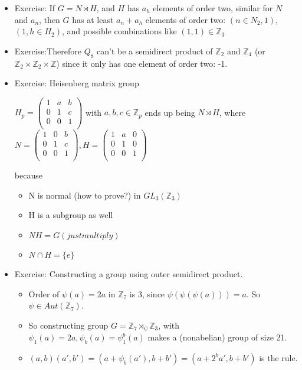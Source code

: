 \documentclass[11pt, oneside]{article}   	%
\begin{document}
\begin{itemize}
\item Exercise: If $G  = N \rtimes H$, and $H$ has $a_h$ elements of order two, similar for $N$ and $a_n$, then $G$ has at least $a_n + a_h$ elements of order two: $(n \in N_2, 1)$, $(1, h \in H_2)$, and possible combinations like $(1,1) \in \mathbb{Z}_3$
\item Exercise:Therefore $Q_8$ can't be a semidirect product of $\mathbb{Z}_2$ and $\mathbb{Z}_4$ (or $\mathbb{Z}_2 \times \mathbb{Z}_2 \times \mathbb{Z}$) since it only has one element of order two: -1.
\item Exercise: Heisenberg matrix group

$H_p = \begin{pmatrix}
    1      & a & b \\
    0       & 1 & c \\
    0       & 0 & 1 \\
\end{pmatrix}$ with $a, b, c \in \mathbb{Z}_p$ ends up being $N \rtimes H$, where  $N = \begin{pmatrix}
    1      & 0  & b \\
    0       & 1 & c \\
    0       & 0 & 1 \\
\end{pmatrix},  H = \begin{pmatrix}
    1      & a  & 0 \\
    0       & 1 & 0 \\
    0       & 0 & 1 \\
\end{pmatrix}$

because
\begin{itemize}
\item N is normal (how to prove?) in $GL_3(\mathbb{Z}_3)$
\item H is a subgroup as well
\item $NH = G (just multiply)$
\item $N \cap H = \{e\}$
\end{itemize}
\item Exercise: Constructing a group using outer semidirect product.
\begin{itemize}
  \item Order of $\psi(a) = 2a$ in $\mathbb{Z}_7$ is 3, since $\psi(\psi(\psi(a))) = a$.  So $\psi \in Aut(\mathbb{Z}_7)$.  
  \item So constructing group  $G = \mathbb{Z}_7  \rtimes_{\psi} \mathbb{Z}_3$, with $\psi_1(a) = 2a, \psi_b(a) = \psi_1^b(a)$ makes a (nonabelian) group of size 21.  
  \item $(a, b)(a', b') = (a+\psi_b(a'), b+b') = (a+2^ba', b+b')$ is the rule.
  \end{itemize}


\end{itemize}
\end{document}

